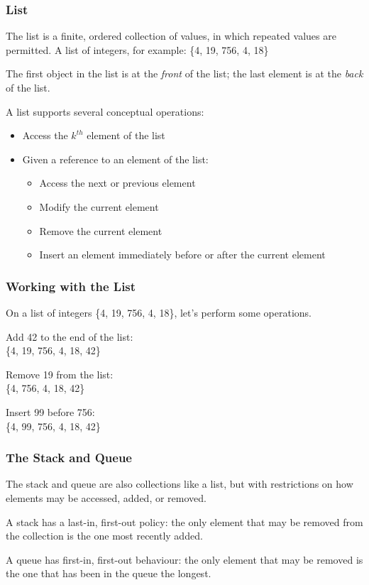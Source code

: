 \begin{frame}
\frametitle{List}

The \alert{list} is a finite, ordered collection of values, in which repeated values are permitted. A list of integers, for example: \{4, 19, 756, 4, 18\}

The first object in the list is at the \textit{front} of the list; the last element is at the \textit{back} of the list.

A list supports several conceptual operations:
\begin{itemize}
	\item Access the $k^{th}$ element of the list
	\item Given a reference to an element of the list:
	\begin{itemize}
	\item Access the next or previous element
	\item Modify the current element
	\item Remove the current element
	\item Insert an element immediately before or after the current element
	\end{itemize}
\end{itemize}

\end{frame}


\begin{frame}
\frametitle{Working with the List}
On a list of integers \{4, 19, 756, 4, 18\}, let's perform some operations.

Add 42 to the end of the list: \\ \{4, 19, 756, 4, 18, 42\}

Remove 19 from the list: \\ \{4, 756, 4, 18, 42\}

Insert 99 before 756: \\ \{4, 99, 756, 4, 18, 42\}

\end{frame}

\begin{frame}
\frametitle{The Stack and Queue}
The \alert{stack} and \alert{queue} are also collections like a list, but with restrictions on how elements may be accessed, added, or removed.

A stack has a last-in, first-out policy: the only element that may be removed from the collection is the one most recently added.

A queue has first-in, first-out behaviour: the only element that may be removed is the one that has been in the queue the longest.

\end{frame}

